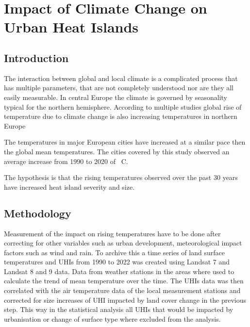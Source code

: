 \documentclass[12pt,a4paper, english,twoside]{article}
\begin{document}
  \newpage
  \section{Impact of Climate Change on Urban Heat Islands}\label{sec:UHITempImp}
    \subsection{Introduction}
       The interaction between global and local climate is a complicated process that has multiple parameters, that are not completely understood nor are they all easily measurable. 
       In central Europe the climate is governed by seasonality typical for the northern hemisphere.  
       According to multiple studies global rise of temperature due to climate change is also increasing temperatures in northern Europe~\autocite{Benestad2005}  %

       The temperatures in major European cities have increased at a similar pace then the global mean temperatures. 
       The cities covered by this study observed an average increase from 1990 to 2020 of %
       \textdegree\ C. 
   
       The hypothesis is that the rising temperatures observed over the past 30 years have increased heat island severity and size. 
    \subsection{Methodology}
      Measurement of the impact on rising temperatures have to be done after correcting for other variables such as urban development, meteorological impact factors such as wind and rain. 
      To archive this a time series of land surface temperatures and \glspl{UHI} from 1990 to 2022 was created using Landsat 7 and Landsat 8 and 9 data.
      Data from weather stations in the areas where used to calculate the trend of mean temperature over the time. 
      The \glspl{UHI} data was then correlated with the air temperature data of the local measurement stations and corrected for size increases of \gls{UHI} impacted by land cover change in the previous step. 
      This way in the statistical analysis all \glspl{UHI} that would be impacted by urbanisation or change of surface type where excluded from the analysis.
\end{document}
